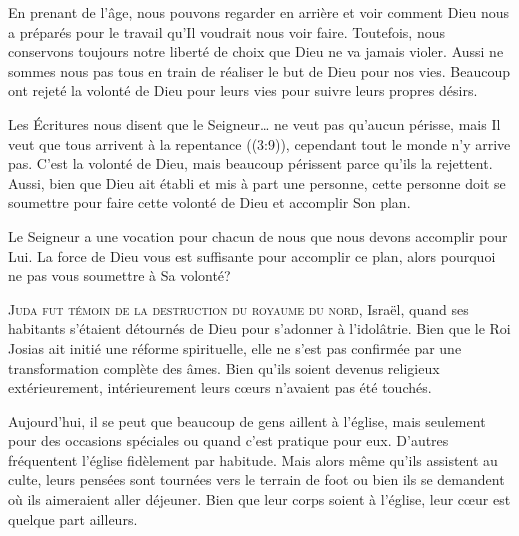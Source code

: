En prenant de l'âge, nous pouvons regarder en arrière et voir
 comment Dieu nous a préparés pour le travail qu'Il voudrait nous voir faire.
 Toutefois, nous conservons toujours notre liberté de choix que Dieu
 ne va jamais violer. Aussi ne sommes nous pas tous en train de réaliser
 le but de Dieu pour nos vies. Beaucoup ont rejeté la volonté de Dieu
 pour leurs vies pour suivre leurs propres désirs. 


Les Écritures nous disent que \og le 
 Seigneur\dots{} ne veut pas qu'aucun périsse, mais Il veut que tous arrivent
 à la repentance \fg{} ((3:9)), cependant tout le monde
 n'y arrive pas. C'est la volonté de Dieu, mais beaucoup périssent
 parce qu'ils la rejettent. Aussi, bien que Dieu ait établi et mis à part
 une personne, cette personne doit se soumettre pour faire cette volonté
 de Dieu et accomplir Son plan. 

Le Seigneur a une vocation pour chacun de nous que nous devons accomplir
 pour Lui. La force de Dieu vous est suffisante pour accomplir ce plan,
 alors pourquoi ne pas vous soumettre à Sa volonté? 

\dvrule






\lettrine{J}{uda fut témoin de la destruction du royaume du nord,} Israël,
 quand ses habitants s'étaient détournés de Dieu pour s'adonner
 à l'idolâtrie. Bien que le Roi Josias ait initié une réforme spirituelle,
 elle ne s'est pas confirmée par une transformation complète des âmes.
 Bien qu'ils soient devenus religieux extérieurement,
 intérieurement leurs cœurs n'avaient pas 
 été touchés. 

Aujourd'hui, il se peut que beaucoup de gens aillent à l'église,
 mais seulement pour des occasions spéciales ou quand c'est pratique pour eux.
 D'autres fréquentent l'église fidèlement \ocadr par habitude.
 Mais alors même qu'ils assistent au culte, leurs pensées sont tournées
 vers le terrain de foot ou bien ils se demandent où ils aimeraient
 aller déjeuner. Bien que leur corps soient à l'église,
 leur cœur est quelque part ailleurs. 

